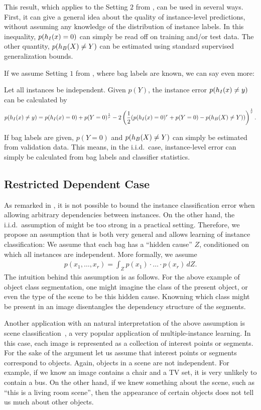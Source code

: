 This result, which applies to the Setting $2$ from ,
can be used in several ways. First, it can give a general idea about the quality of instance-level
predictions, without assuming any knowledge of the distribution of instance labels. In this inequality,
$p(h_I(x)=0)$ can simply be read off on training and/or test data. The other quantity, $p(h_B(X) \neq Y)$ can be
estimated using standard supervised generalization bounds.

If we assume Setting $1$ from , where bag labels are known, we can say even more:
\begin{theorem}\label{equality}
Let all instances be independent. Given $p(Y)$, the instance error $p(h_I(x) \neq y)$ can be calculated by
\begin{align}
p(h_I(x) \neq y) = p(h_I(x)=0) + p(Y=0)^\frac{1}{r} - 2 \left (\frac{1}{2} ( p(h_I(x)=0)^r + p(Y=0) - p(h_B(X) \neq Y)) \right)^\frac{1}{r}.
\end{align}
\end{theorem}
If bag labels are given, $p(Y=0)$ and $ p(h_B(X) \neq Y)$ can simply be estimated from validation data.
This means, in the i.i.d.\ case, instance-level error can simply be calculated
from bag labels and classifier statistics.

\subsection{Restricted Dependent Case}
As remarked in , it is not possible to bound the instance classification error
when allowing arbitrary dependencies between instances. On the other hand, the i.i.d.\ assumption of 
might be too strong in a practical setting.
Therefore, we propose an assumption that is both very general and allows learning of instance classification:
We assume that each bag has a ``hidden cause'' $Z$, conditioned on which all instances are independent.
More formally, we assume
\begin{align}
    p(x_1,\dotsc,x_r)=\int_Z p(x_1)\cdot \dotsc \cdot p(x_r) \, dZ.
\end{align}
The intuition behind this assumption is as follows.
For the above example of object class segmentation, one might imagine the class of the present object,
or even the type of the scene to be this hidden cause. Knowning which class might be present
in an image disentangles the dependency structure of the segments.

Another application with an natural interpretation of the above assumption is
scene classification~\citep{zhou2007multi,zha2008joint,zhou2009multi}, a very
popular application of multiple-instance learning.
In this case, each image is represented as a collection of interest points or
segments.  For the sake of the argument let us assume that interest points or
segments correspond to objects.  Again, objects in a scene are not independent.
For example, if we know an image contains a chair and a TV set, it is very
unlikely to contain a bus.  On the other hand, if we knew something about the
scene, such as ``this is a living room scene'', then the appearance of certain
objects does not tell us much about other objects.

